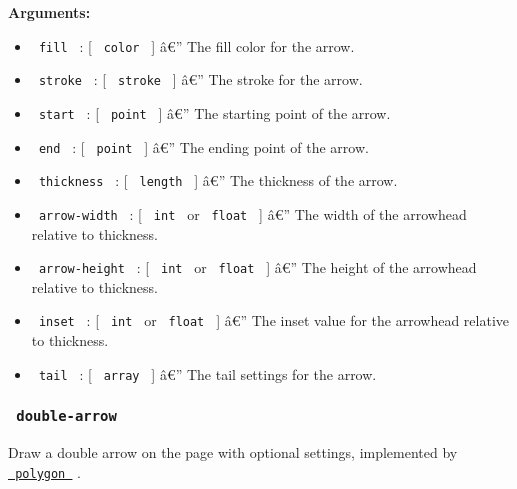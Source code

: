 \textbf{Arguments:}

\begin{itemize}
\tightlist
\item
  \texttt{\ fill\ } : {[} \texttt{\ color\ } {]} â€'' The fill color for
  the arrow.
\item
  \texttt{\ stroke\ } : {[} \texttt{\ stroke\ } {]} â€'' The stroke for
  the arrow.
\item
  \texttt{\ start\ } : {[} \texttt{\ point\ } {]} â€'' The starting
  point of the arrow.
\item
  \texttt{\ end\ } : {[} \texttt{\ point\ } {]} â€'' The ending point of
  the arrow.
\item
  \texttt{\ thickness\ } : {[} \texttt{\ length\ } {]} â€'' The
  thickness of the arrow.
\item
  \texttt{\ arrow-width\ } : {[} \texttt{\ int\ } or \texttt{\ float\ }
  {]} â€'' The width of the arrowhead relative to thickness.
\item
  \texttt{\ arrow-height\ } : {[} \texttt{\ int\ } or \texttt{\ float\ }
  {]} â€'' The height of the arrowhead relative to thickness.
\item
  \texttt{\ inset\ } : {[} \texttt{\ int\ } or \texttt{\ float\ } {]}
  â€'' The inset value for the arrowhead relative to thickness.
\item
  \texttt{\ tail\ } : {[} \texttt{\ array\ } {]} â€'' The tail settings
  for the arrow.
\end{itemize}

\subsubsection{\texorpdfstring{\texttt{\ double-arrow\ }}{ double-arrow }}\label{double-arrow}

Draw a double arrow on the page with optional settings, implemented by
\href{https://typst.app/docs/reference/visualize/polygon/}{\texttt{\ polygon\ }}
.

\begin{Shaded}
\begin{Highlighting}[]
\end{Highlighting}
\end{Shaded}

